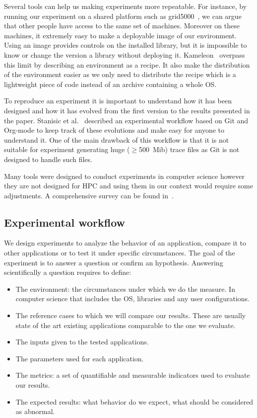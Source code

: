 Several tools can help us making experiments more repeatable.
For instance, by running our experiment on a shared platform such as grid5000~\cite{Cappello05Grid5000}, we can argue that other people have access to the same set of machines.
Moreover on these machines, it extremely easy to make a deployable image of our environment.
Using an image provides controls on the installed library, but it is impossible to know or change the version a library without deploying it.
\gls{Kameleon}~\cite{Ruiz15Reconstructable} overpass this limit by describing an environment as a recipe.
It also make the distribution of the environment easier as we only need to distribute the recipe which is a lightweight piece of code instead of an archive containing a whole \gls{OS}.

To reproduce an experiment it is important to understand how it has been designed and how it has evolved from the first version to the results presented in the paper.
Stanisic et al.~\cite[Chapter~4, p31-44]{Stanisic15Reproducible} described an experimental workflow based on \gls{Git} and \gls{Org-mode} to keep track of these evolutions and make easy for anyone to understand it.
One of the main drawback of this workflow is that it is not suitable for experiment generating huge ($\ge$\SI{500}{Mib}) trace files as \gls{Git} is not designed to handle such files.

Many tools were designed to conduct experiments in computer science however they are not designed for \gls{HPC} and using them in our context would require some adjustments.
A comprehensive survey can be found in~\cite[Chapter~3, p17-19]{Stanisic15Reproducible}.

\subsection{Experimental workflow}

We design experiments to analyze the behavior of an application, compare it to other applications or to test it under specific circumstances.
The goal of the experiment is to answer a question or confirm an hypothesis.
Answering scientifically a question requires to define:
\begin{itemize}
    \item The environment: the circumstances under which we do the measure.
    In computer science that includes the \gls{OS}, libraries and any user configurations.
    \item The reference cases to which we will compare our results.
        These are usually state of the art existing applications comparable to the one we evaluate.
    \item The inputs given to the tested applications.
    \item The parameters used for each application.
    \item The metrics: a set of quantifiable and measurable indicators used to evaluate our results.
    \item The expected results: what behavior do we expect, what should be considered as abnormal.
\end{itemize}

